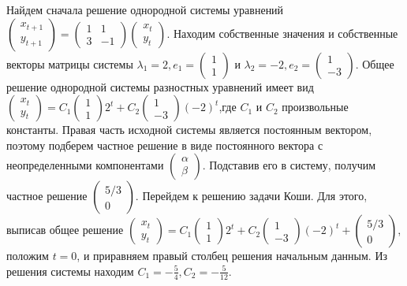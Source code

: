 \begin{solution}
Найдем сначала решение однородной системы уравнений $\left(\begin{array}{c} {x_{t+1} } \\ {y_{t+1} } \end{array}\right)=\left(\begin{array}{cc} {1} & {1} \\ {3} & {-1} \end{array}\right)\left(\begin{array}{c} {x_{t} } \\ {y_{t} } \end{array}\right)$. Находим собственные значения и собственные векторы матрицы системы $\lambda _{1} =2, e_{1} =\left(\begin{array}{c} {1} \\ {1} \end{array}\right)$ и $\lambda _{2} =-2, e_{2} =\left(\begin{array}{c} {1} \\ {-3} \end{array}\right)$. Общее решение однородной системы разностных уравнений имеет вид $\left(\begin{array}{c} {x_{t} } \\ {y_{t} } \end{array}\right)=C_{1} \left(\begin{array}{c} {1} \\ {1} \end{array}\right)2^{t} +C_{2} \left(\begin{array}{c} {1} \\ {-3} \end{array}\right)(-2)^{t} $,где $C_{1} $ и $C_{2} $ произвольные константы. Правая часть исходной системы является постоянным вектором, поэтому подберем частное решение в виде постоянного вектора с неопределенными компонентами $\left(\begin{array}{c} {\alpha } \\ {\beta } \end{array}\right)$. Подставив его в систему, получим частное решение $\left(\begin{array}{c} {5/3} \\ {0} \end{array}\right)$. Перейдем к решению задачи Коши. Для этого, выписав общее решение $\left(\begin{array}{c} {x_{t} } \\ {y_{t} } \end{array}\right)=C_{1} \left(\begin{array}{c} {1} \\ {1} \end{array}\right)2^{t} +C_{2} \left(\begin{array}{c} {1} \\ {-3} \end{array}\right)(-2)^{t} +\left(\begin{array}{c} {5/3} \\ {0} \end{array}\right)$, положим $t=0$, и приравняем правый столбец решения начальным данным. Из решения системы находим $C_{1} =-\frac{5}{4} , C_{2} =-\frac{5}{12} $.

\end{solution}
